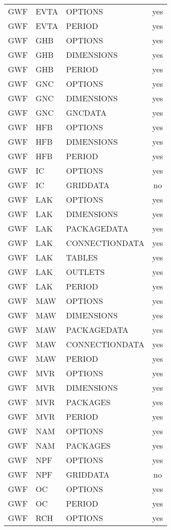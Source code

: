 \begin{longtable}{p{1.5cm} p{1.5cm} p{3cm} c}
\hline
GWF & EVTA & OPTIONS & yes \\ 
GWF & EVTA & PERIOD & yes \\ 
\hline
GWF & GHB & OPTIONS & yes \\ 
GWF & GHB & DIMENSIONS & yes \\ 
GWF & GHB & PERIOD & yes \\ 
\hline
GWF & GNC & OPTIONS & yes \\ 
GWF & GNC & DIMENSIONS & yes \\ 
GWF & GNC & GNCDATA & yes \\ 
\hline
GWF & HFB & OPTIONS & yes \\ 
GWF & HFB & DIMENSIONS & yes \\ 
GWF & HFB & PERIOD & yes \\ 
\hline
GWF & IC & OPTIONS & yes \\ 
GWF & IC & GRIDDATA & no \\ 
\hline
GWF & LAK & OPTIONS & yes \\ 
GWF & LAK & DIMENSIONS & yes \\ 
GWF & LAK & PACKAGEDATA & yes \\ 
GWF & LAK & CONNECTIONDATA & yes \\ 
GWF & LAK & TABLES & yes \\ 
GWF & LAK & OUTLETS & yes \\ 
GWF & LAK & PERIOD & yes \\ 
\hline
GWF & MAW & OPTIONS & yes \\ 
GWF & MAW & DIMENSIONS & yes \\ 
GWF & MAW & PACKAGEDATA & yes \\ 
GWF & MAW & CONNECTIONDATA & yes \\ 
GWF & MAW & PERIOD & yes \\ 
\hline
GWF & MVR & OPTIONS & yes \\ 
GWF & MVR & DIMENSIONS & yes \\ 
GWF & MVR & PACKAGES & yes \\ 
GWF & MVR & PERIOD & yes \\ 
\hline
GWF & NAM & OPTIONS & yes \\ 
GWF & NAM & PACKAGES & yes \\ 
\hline
GWF & NPF & OPTIONS & yes \\ 
GWF & NPF & GRIDDATA & no \\ 
\hline
GWF & OC & OPTIONS & yes \\ 
GWF & OC & PERIOD & yes \\ 
\hline
GWF & RCH & OPTIONS & yes \\ 

\end{longtable}
